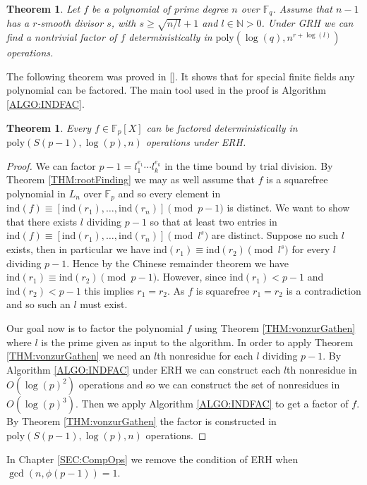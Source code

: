 \documentclass{article}
\newcounter{dummy} \numberwithin{dummy}{section}
\theoremstyle{plain}
\newtheorem{thm}[dummy]{Theorem}
\theoremstyle{definition}
\def\Fp {{ \mathbb{F} _ {p} }}
\def\Fq {{ \mathbb{F} _ {q} }}
\def\ind {{ \mathrm{ind} }}
\def\poly {{ \mathrm{poly} }}
\begin{document}
		    \begin{thm} 
				\label{THM:MorePrime}
			    Let $f$ be a polynomial of prime degree $n$ over $\Fq$. Assume that $n-1$ has a $r$-smooth divisor $s$, with $s \geq \sqrt{n/l}+1$ and $l \in \mathbb{N}>0$. Under GRH we can find a nontrivial factor of $f$ deterministically in $\poly(\log(q), n^{r+\log(l)})$ operations.
		    \end{thm}
		
				
				The following theorem was proved in []. It shows that for special finite fields any polynomial can be factored. The main tool used in the proof is Algorithm \ref{ALGO:INDFAC}.
		    \begin{thm} 
				\label{THM:SmoothFac}
		        Every $f \in \Fp[X]$ can be factored deterministically in $\poly(S(p-1),\log(p),n)$ operations under ERH.
		    \end{thm}
		
		    \begin{proof}
		        We can factor $p-1=l_1^{e_1}\cdots l_k^{e_k}$ in the time bound by trial division. By Theorem \ref{THM:rootFinding} we may as well assume that $f$ is a squarefree polynomial in $L_n$ over $\Fp$ and so every element in $\ind(f) \equiv [\ind(r_1),\ldots, \ind(r_n)] \pmod {p-1}$ is distinct. We want to show that there exists $l$ dividing $p-1$ so that at least two entries in $\ind(f) \equiv [\ind(r_1),\ldots,\ind(r_n)] \pmod {l^s}$ are distinct. Suppose no such $l$ exists, then in particular we have $\ind(r_1) \equiv \ind(r_2) \pmod {l^s}$ for every $l$ dividing $p-1$. Hence by the Chinese remainder theorem we have $\ind(r_1) \equiv \ind(r_2) \pmod {p-1}$. However, since $\ind(r_1) < p-1$ and $\ind(r_2) < p-1$ this implies $r_1 = r_2$. As $f$ is squarefree $r_1=r_2$ is a contradiction and so such an $l$ must exist. 
						
						Our goal now is to factor the polynomial $f$ using Theorem \ref{THM:vonzurGathen} where $l$ is the prime given as input to the algorithm. In order to apply Theorem \ref{THM:vonzurGathen} we need an $l$th nonresidue for each $l$ dividing $p-1$. By Algorithm \ref{ALGO:INDFAC} under ERH we can construct each $l$th nonresidue in $O(\log(p)^2)$ operations and so we can construct the set of nonresidues in $O(\log(p)^3)$. Then we apply Algorithm \ref{ALGO:INDFAC} to get a factor of $f$. By Theorem \ref{THM:vonzurGathen} the factor is constructed in $\poly(S(p-1),\log(p),n)$ operations.
		    \end{proof}
				In Chapter \ref{SEC:CompOps} we remove the condition of ERH when $\gcd(n,\phi(p-1))=1$.
	
\end{document}
